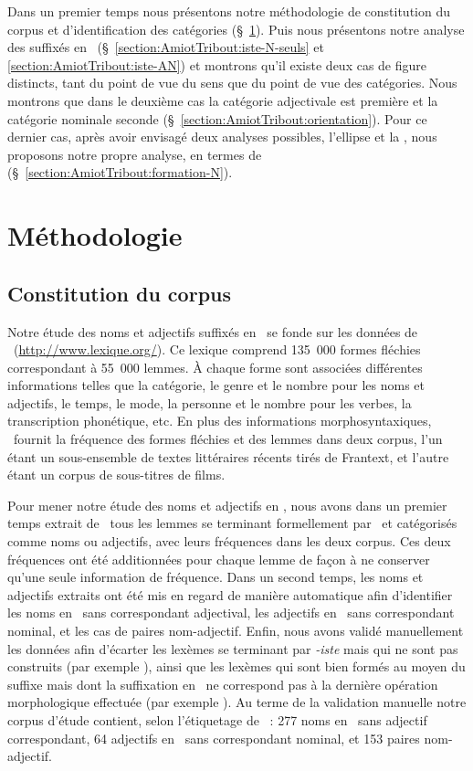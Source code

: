 \documentclass[output=paper]{LSP/langsci}
\begin{document}
Dans un premier temps nous présentons notre méthodologie de constitution du corpus et d'identification des catégories (§~\ref{section:AmiotTribout:methodo}).  Puis nous présentons notre analyse des suffixés en \iste\ (§~\ref{section:AmiotTribout:iste-N-seuls} et \ref{section:AmiotTribout:iste-AN}) et montrons qu'il existe deux cas de figure distincts, tant du point de vue du sens que du point de vue des catégories. Nous montrons que dans le deuxième cas la catégorie adjectivale est première et la catégorie nominale seconde (§~\ref{section:AmiotTribout:orientation}). Pour ce dernier cas, après avoir envisagé deux analyses possibles, l'ellipse et la , nous proposons notre propre analyse, en termes de  (§~\ref{section:AmiotTribout:formation-N}).



\section{Méthodologie} \label{section:AmiotTribout:methodo}
\subsection{Constitution du corpus}\label{section:AmiotTribout:methodo-corpus}
Notre étude des noms et adjectifs suffixés en \iste\ se fonde sur les données de \lexiq\ (\url{http://www.lexique.org/}). Ce lexique comprend 135~000 formes fléchies correspondant à 55~000 lemmes. À chaque forme sont associées différentes informations telles que la catégorie, le genre et le nombre pour les noms et adjectifs, le temps, le mode, la personne et le nombre pour les verbes, la transcription phonétique, etc. En plus des informations morphosyntaxiques, \lexiq\ fournit la fréquence des formes fléchies et des lemmes dans deux corpus, l'un étant un sous-ensemble de textes littéraires récents tirés de Frantext, et l'autre étant un corpus de sous-titres de films.

Pour mener notre étude des noms et adjectifs en \iste, nous avons dans un premier temps extrait de \lexiq\ tous les lemmes se terminant formellement par \iste\ et catégorisés comme noms ou adjectifs, avec leurs fréquences dans les deux corpus. Ces deux fréquences ont été additionnées pour chaque lemme de façon à ne conserver qu'une seule information de fréquence.
Dans un second temps, les noms et adjectifs extraits ont été mis en regard de manière automatique afin d'identifier les noms en \iste\ sans correspondant adjectival, les adjectifs en \iste\ sans correspondant nominal, et les cas de paires nom-adjectif.
Enfin, nous avons validé manuellement les données afin d'écarter les lexèmes se terminant par \textit{-iste} mais qui ne sont pas construits (par exemple ), ainsi que les lexèmes qui sont bien formés au moyen du suffixe mais dont la suffixation en \iste\ ne correspond pas à la dernière opération morphologique effectuée (par exemple ).
Au terme de la validation manuelle notre corpus d'étude contient, selon l'étiquetage de \lexiq~: 277 noms en \iste\ sans adjectif correspondant, 64 adjectifs en \iste\ sans correspondant nominal, et 153 paires nom-adjectif.
\end{document}
